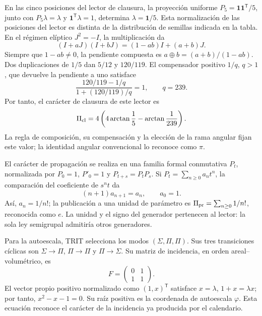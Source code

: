 En las cinco posiciones del lector de clausura, la proyección uniforme
\(P_5=\mathbf1\mathbf1^{\mathsf T}/5\), junto con
\(P_5\lambda=\lambda\) y \(\mathbf1^{\mathsf T}\lambda=1\), determina
\(\lambda=\mathbf1/5\). Esta normalización de las posiciones del lector
es distinta de la distribución de semillas indicada en la tabla.
En el régimen elíptico \(J^2=-I\), la multiplicación da
\[
(I+aJ)(I+bJ)=(1-ab)I+(a+b)J.
\]
Siempre que \(1-ab\ne0\), la pendiente compuesta es
\(a\oplus b=(a+b)/(1-ab)\). Dos duplicaciones de \(1/5\) dan
\(5/12\) y \(120/119\). El compensador positivo \(1/q\), \(q>1\),
que devuelve la pendiente a uno satisface
\[
\frac{120/119-1/q}{1+(120/119)/q}=1,
\qquad q=239.
\]
Por tanto, el carácter de clausura de este lector es
\begin{equation}
 \Pi_{\rm cl}=4\left(4\arctan\frac15-\arctan\frac1{239}\right).
 \label{vi:vi:dep:lector-clausura}
\end{equation}
La regla de composición, su compensación y la elección de la rama angular
fijan este valor; la identidad angular convencional lo reconoce como \(\pi\).

El carácter de propagación se realiza en una familia formal conmutativa
\(P_t\), normalizada por \(P_0=1\), \(P'_0=1\) y
\(P_{t+s}=P_tP_s\). Si \(P_t=\sum_{n\ge0}a_nt^n\), la comparación
del coeficiente de \(s^nt\) da
\[
 (n+1)a_{n+1}=a_n,\qquad a_0=1.
\]
Así, \(a_n=1/n!\); la publicación a una unidad de parámetro es
\(\Pi_{\rm pr}=\sum_{n\ge0}1/n!\), reconocida como \(e\).
La unidad y el signo del generador pertenecen al lector: la sola ley
semigrupal admitiría otros generadores.

Para la autoescala, TRIT selecciona los modos
\((\Sigma,\Pi,\Pi)\). Sus tres transiciones cíclicas son
\(\Sigma\to\Pi\), \(\Pi\to\Pi\) y \(\Pi\to\Sigma\). Su matriz
de incidencia, en orden areal--volumétrico, es
\begin{equation}
 F=\begin{pmatrix}0&1\\1&1\end{pmatrix}.
 \label{vi:vi:dep:incidencia-hojas}
\end{equation}
El vector propio positivo normalizado como \((1,x)^{\mathsf T}\)
satisface \(x=\lambda\), \(1+x=\lambda x\); por tanto,
\(x^2-x-1=0\). Su raíz positiva es la coordenada de autoescala
\(\varphi\). Esta ecuación reconoce el carácter de la incidencia ya
producida por el calendario.

